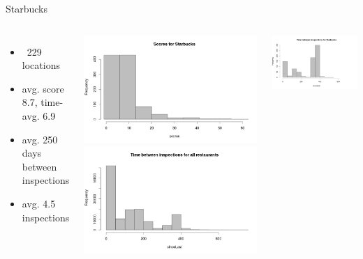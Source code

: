 \documentclass[12pt]{beamer}
\begin{document}
\begin{frame}{Starbucks}
\begin{columns}[C]
	\vfill
	\begin{itemize}
		\item ~229 locations
		\item avg. score 8.7, time-avg. 6.9
		\item avg. 250 days between inspections
		\item avg. 4.5 inspections
	\end{itemize}
	\vfill
	\includegraphics[width=\textwidth]{plots/scores_starbucks}
	\vfill
	\includegraphics[width=\textwidth]{plots/time_all}
	
	\includegraphics[width=\textwidth]{plots/time_starbucks}
\end{columns}
\end{frame}
\end{document}
